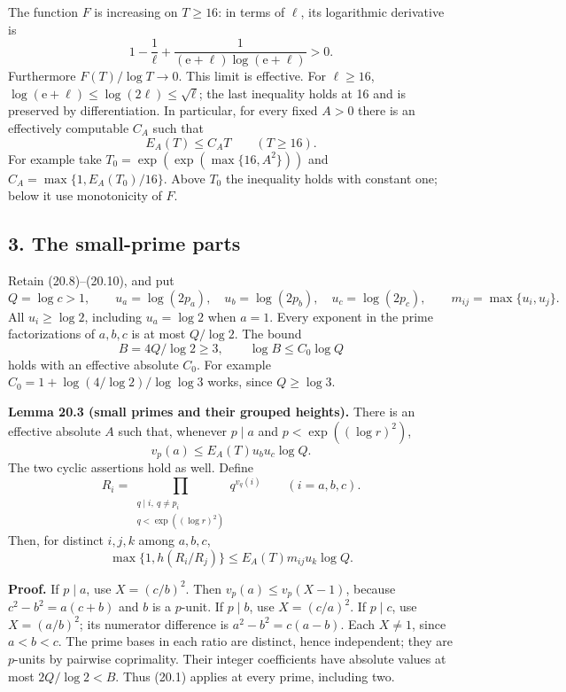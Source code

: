 \documentclass[
  11pt,
  a4paper,
]{article}
\begin{document}
The function \(F\) is increasing on \(T\ge16\): in terms of \(\ell\),
its logarithmic derivative is \[
 1-\frac1\ell+
 \frac1{(\mathrm e+\ell)\log(\mathrm e+\ell)}>0.
 \tag{20.14}
\] Furthermore \(F(T)/\log T\to0\). This limit is effective. For
\(\ell\ge16\), \(\log(\mathrm e+\ell)\le\log(2\ell)\le\sqrt\ell\); the
last inequality holds at 16 and is preserved by differentiation. In
particular, for every fixed \(A>0\) there is an effectively computable
\(C_A\) such that \[
 E_A(T)\le C_A T\qquad(T\ge16).
 \tag{20.15}
\] For example take \(T_0=\exp(\exp(\max\{16,A^2\}))\) and
\(C_A=\max\{1,E_A(T_0)/16\}\). Above \(T_0\) the inequality holds with
constant one; below it use monotonicity of \(F\).

\subsection{3. The small-prime parts}\label{the-small-prime-parts}

Retain (20.8)--(20.10), and put \[
 Q=\log c>1,\qquad
 u_a=\log(2p_a),\quad u_b=\log(2p_b),\quad u_c=\log(2p_c),
 \qquad m_{ij}=\max\{u_i,u_j\}.
 \tag{20.16}
\] All \(u_i\ge\log2\), including \(u_a=\log2\) when \(a=1\). Every
exponent in the prime factorizations of \(a,b,c\) is at most
\(Q/\log2\). The bound \[
 B=4Q/\log2\ge3,\qquad \log B\le C_0\log Q
 \tag{20.17}
\] holds with an effective absolute \(C_0\). For example
\(C_0=1+\log(4/\log2)/\log\log3\) works, since \(Q\ge\log3\).

\textbf{Lemma 20.3 (small primes and their grouped heights).} There is
an effective absolute \(A\) such that, whenever \(p\mid a\) and
\(p<\exp((\log r)^2)\), \[
 v_p(a)\le E_A(T)u_bu_c\log Q.
 \tag{20.18}
\] The two cyclic assertions hold as well. Define \[
 R_i=\prod_{\substack{q\mid i,\ q\ne p_i\\
                         q<\exp((\log r)^2)}}q^{v_q(i)}
       \qquad(i=a,b,c).
 \tag{20.19}
\] Then, for distinct \(i,j,k\) among \(a,b,c\), \[
 \max\{1,h(R_i/R_j)\}
       \le E_A(T)m_{ij}u_k\log Q.
 \tag{20.20}
\]

\textbf{Proof.} If \(p\mid a\), use \(X=(c/b)^2\). Then
\(v_p(a)\le v_p(X-1)\), because \(c^2-b^2=a(c+b)\) and \(b\) is a
\(p\)-unit. If \(p\mid b\), use \(X=(c/a)^2\). If \(p\mid c\), use
\(X=(a/b)^2\); its numerator difference is \(a^2-b^2=c(a-b)\). Each
\(X\ne1\), since \(a<b<c\). The prime bases in each ratio are distinct,
hence independent; they are \(p\)-units by pairwise coprimality. Their
integer coefficients have absolute values at most \(2Q/\log2<B\). Thus
(20.1) applies at every prime, including two.
\end{document}
